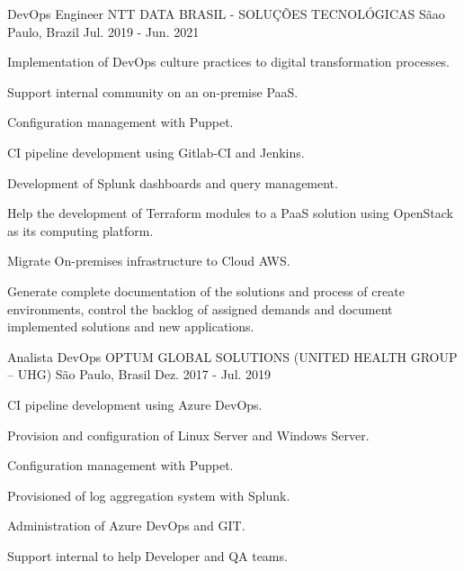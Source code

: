 \begin{cventries}
  \cventry
    {DevOps Engineer} %
    {NTT DATA BRASIL - SOLUÇÕES TECNOLÓGICAS} %
    {Sãao Paulo, Brazil} %
    {Jul. 2019 - Jun. 2021} %
    {
      \begin{cvitems} %
        \item {Implementation of DevOps culture practices to digital transformation processes.}
        \item {Support internal community on an on‑premise PaaS.}
        \item {Configuration management with Puppet.}
        \item {CI pipeline development using Gitlab‑CI and Jenkins.}
        \item {Development of Splunk dashboards and query management.}
        \item {Help the development of Terraform modules to a PaaS solution using OpenStack as its computing platform.}
        \item {Migrate On-premises infrastructure to Cloud AWS.}
        \item {Generate complete documentation of the solutions and process of create environments, control the backlog of assigned demands and document implemented solutions and new applications.}
      \end{cvitems}
    }
\break

  \cventry
    {Analista DevOps} %
    {OPTUM GLOBAL SOLUTIONS (UNITED HEALTH GROUP – UHG)} %
    {São Paulo, Brasil} %
    {Dez. 2017 - Jul. 2019} %
    {
      \begin{cvitems} %
        \item {CI pipeline development using Azure DevOps.}
        \item {Provision and configuration of Linux Server and Windows Server.}
        \item {Configuration management with Puppet.}
        \item {Provisioned of log aggregation system with Splunk.}
        \item {Administration of Azure DevOps and GIT.}
        \item {Support internal to help Developer and QA teams.}
      \end{cvitems}
    }


\end{cventries}
